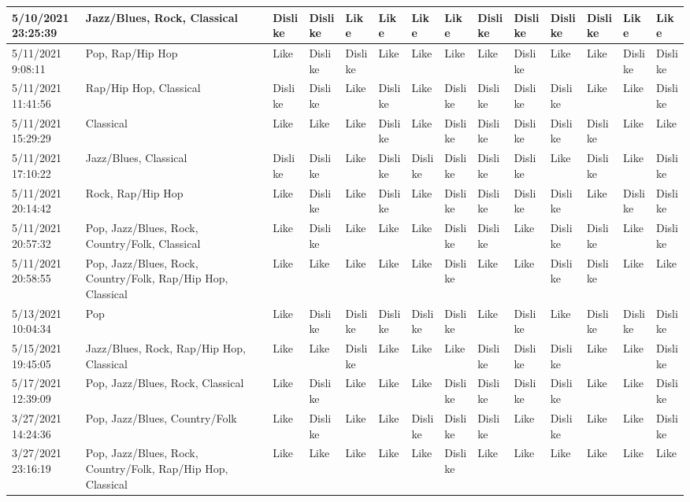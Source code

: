 \begin{table}
{\begin{tabular}{|l|l|l|l|l|l|l|l|l|l|l|l|l|l|}
        5/10/2021 23:25:39 & Jazz/Blues, Rock, Classical & Dislike & Dislike & Like & Like & Like & Like & Dislike & Dislike & Dislike & Dislike & Like & Like \\ \hline
        5/11/2021 9:08:11 & Pop, Rap/Hip Hop & Like & Dislike & Dislike & Like & Like & Like & Like & Dislike & Like & Like & Dislike & Dislike \\ \hline
        5/11/2021 11:41:56 & Rap/Hip Hop, Classical & Dislike & Dislike & Like & Dislike & Like & Dislike & Dislike & Dislike & Dislike & Like & Like & Dislike \\ \hline
        5/11/2021 15:29:29 & Classical & Like & Like & Like & Dislike & Like & Dislike & Dislike & Dislike & Dislike & Dislike & Like & Like \\ \hline
        5/11/2021 17:10:22 & Jazz/Blues, Classical & Dislike & Dislike & Like & Dislike & Dislike & Dislike & Dislike & Dislike & Like & Dislike & Like & Dislike \\ \hline
        5/11/2021 20:14:42 & Rock, Rap/Hip Hop & Like & Dislike & Like & Dislike & Like & Dislike & Dislike & Dislike & Dislike & Like & Dislike & Dislike \\ \hline
        5/11/2021 20:57:32 & Pop, Jazz/Blues, Rock, Country/Folk, Classical & Like & Dislike & Like & Like & Like & Dislike & Dislike & Like & Dislike & Dislike & Like & Dislike \\ \hline
        5/11/2021 20:58:55 & Pop, Jazz/Blues, Rock, Country/Folk, Rap/Hip Hop, Classical & Like & Like & Like & Like & Like & Dislike & Like & Like & Dislike & Dislike & Like & Like \\ \hline
        5/13/2021 10:04:34 & Pop & Like & Dislike & Dislike & Dislike & Dislike & Dislike & Like & Dislike & Like & Dislike & Dislike & Dislike \\ \hline
        5/15/2021 19:45:05 & Jazz/Blues, Rock, Rap/Hip Hop, Classical & Like & Like & Dislike & Like & Like & Like & Dislike & Dislike & Dislike & Like & Like & Dislike \\ \hline
        5/17/2021 12:39:09 & Pop, Jazz/Blues, Rock, Classical & Like & Dislike & Like & Like & Like & Dislike & Dislike & Dislike & Dislike & Like & Like & Dislike \\ \hline
        3/27/2021 14:24:36 & Pop, Jazz/Blues, Country/Folk & Like & Dislike & Like & Like & Dislike & Dislike & Dislike & Like & Dislike & Like & Like & Dislike \\ \hline
        3/27/2021 23:16:19 & Pop, Jazz/Blues, Rock, Country/Folk, Rap/Hip Hop, Classical & Like & Like & Like & Like & Like & Dislike & Like & Like & Like & Like & Like & Like \\ \hline

\end{tabular}}
\end{table}
